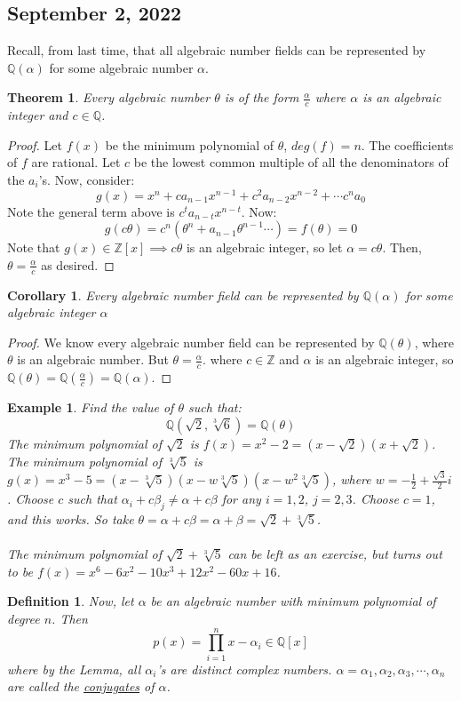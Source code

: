 \documentclass{article}
\newcommand{\Q}{\mathbb{Q}}
\newcommand{\Z}{\mathbb{Z}}
\newtheorem{theorem}{Theorem}
\newtheorem{cor}{Corollary}
\newtheorem{example}{Example}
\newtheorem{definition}{Definition}
\begin{document}
\subsection{September 2, 2022}
Recall, from last time, that all algebraic number fields can be represented by $\Q(\alpha)$ for some algebraic number $\alpha$.
\begin{theorem}
Every algebraic number $\theta$ is of the form $\frac{\alpha}{c}$ where $\alpha$ is an algebraic integer and $c\in \Q$. 
\end{theorem}
\begin{proof}
Let $f(x)$ be the minimum polynomial of $\theta$, $deg(f)=n$. The coefficients of $f$ are rational. Let $c$ be the lowest common multiple of all the denominators of the $a_i$'s. Now, consider:
$$g(x)=x^n+ca_{n-1}x^{n-1}+c^2a_{n-2}x^{n-2}+\cdots c^na_0$$
Note the general term above is $c^ta_{n-t}x^{n-t}$. Now:
$$g(c\theta) = c^n(\theta^n+a_{n-1}\theta^{n-1}\cdots ) = f(\theta)=0$$
Note that $g(x)\in\Z[x]\implies c\theta$ is an algebraic integer, so let $\alpha=c\theta$. Then, $\theta=\frac{\alpha}{c}$ as desired.
\end{proof}
\begin{cor}
Every algebraic number field can be represented by $\Q(\alpha)$ for some algebraic integer $\alpha$
\end{cor}
\begin{proof}
We know every algebraic number field can be represented by $\Q(\theta)$, where $\theta$ is an algebraic number. But $\theta=\frac{\alpha}{c}$. where $c\in\Z$ and $\alpha$ is an algebraic integer, so $\Q(\theta)=\Q(\frac{\alpha}{c})=\Q(\alpha)$.
\end{proof}
\begin{example}
Find the value of $\theta$ such that:
$$\Q(\sqrt{2},\sqrt[3]{6}) = \Q(\theta)$$
The minimum polynomial of $\sqrt{2}$ is $f(x)=x^2-2=(x-\sqrt{2})(x+\sqrt{2})$. The minimum polynomial of $\sqrt[3]{5}$ is $g(x)=x^3-5=(x-\sqrt[3]{5})(x-w\sqrt[3]{5})(x-w^2\sqrt[3]{5})$, where $w=-\frac{1}{2}+\frac{\sqrt{3}}{2}i$. Choose $c$ such that $\alpha_i+c\beta_j\neq \alpha+c\beta$ for any $i=1,2$, $j=2,3$. Choose $c=1$, and this works. So take $\theta=\alpha+c\beta = \alpha+\beta =\sqrt{2}+\sqrt[3]{5}$.\\
\\
The minimum polynomial of $\sqrt{2}+\sqrt[3]{5}$ can be left as an exercise, but turns out to be $f(x)=x^6-6x^2-10x^3+12x^2-60x+16$.
\end{example}
\begin{definition}
Now, let $\alpha$ be an algebraic number with minimum polynomial of degree $n$. Then $$p(x)=\displaystyle\prod_{i=1}^nx-\alpha_i \in \Q[x]$$ where by the Lemma, all $\alpha_i$'s are distinct complex numbers. $\alpha=\alpha_1, \alpha_2,\alpha_3,\cdots, \alpha_n$ are called the \underline{conjugates} of $\alpha$.
\end{definition}
\end{document}
